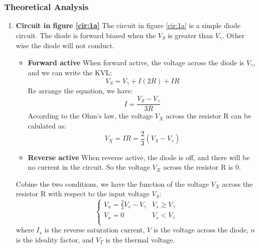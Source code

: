     \subsubsection{Theoretical Analysis}
        \begin{enumerate}[a]
            \item \textbf{Circuit in figure \ref{cir:1a}}\newline
                The circuit in figure \ref{cir:1a} is a simple diode circuit. The diode is forward biased when the $V_S$ is greater than $V_{\gamma}$. Other wise the diode will not conduct. 
                \begin{itemize}
                \item \textbf{Forward active}\newline
                    When forward active, the voltage across the diode is $V_{\gamma}$, and we can write the KVL:
                    \begin{equation}
                        V_S = V_{\gamma} + I(2R) + IR
                    \end{equation}
                    Re arrange the equation, we have:
                    \begin{equation}
                        I = \frac{V_S - V_{\gamma}}{3R}
                    \end{equation}
                    According to the Ohm's law, the voltage $V_X$ across the resistor R can be calulated as:
                    \begin{equation}
                        V_X = IR = \frac{2}{3}(V_S - V_{\gamma})
                    \end{equation}
                \item \textbf{Reverse active}\newline
                    When reverse active, the diode is off, and there will be no current in the circuit. So the voltage $V_X$ across the resistor R is 0.
                \end{itemize}
                Cobine the two conditions, we have the function of the voltage $V_X$ across the resistor R with respect to the input voltage $V_S$:
                \begin{equation}
                    \begin{cases}
                        V_x = \frac{2}{3}V_s - V_\gamma & V_s \ge V_\gamma\\
                        V_x = 0 & V_s < V_\gamma\\
                    \end{cases}
                \label{eq:1a}
                \end{equation}
                where $I_s$ is the reverse saturation current, $V$ is the voltage across the diode, $n$ is the ideality factor, and $V_T$ is the thermal voltage.


\end{enumerate}
